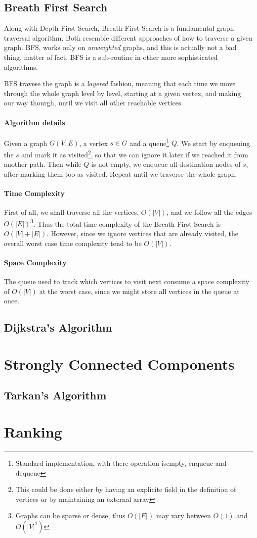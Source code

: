 \documentclass[12pt]{article}
\begin{document}
\subsection{Breath First Search}

Along with Depth First Search, Breath First Search is a fundamental graph traversal algorithm. Both resemble different approaches of how to traverse a given graph. BFS, works only on \textit{unweighted} graphs, and this is actually not a bad thing, matter of fact, BFS is a sub-routine in other more sophisticated algorithms.

BFS travese the graph is a \textit{layered} fashion, meaning that each time we move through the whole graph level by level, starting at a given vertex, and making our way thourgh, until we visit all other reachable vertices.

\paragraph{Algorithm details} Given a graph $G(V,E)$, a vertex $s \in G$ and a queue\footnote{Standard implementation, with there operation isempty, enqueue and dequeue} $Q$. We start by enqueuing the $s$ and mark it as visited\footnote{This could be done either by having an explicite field in the definition of vertices or by maintaining an external array}, so that we can ignore it later if we reached it from another path. Then while $Q$ is not empty, we enqueue all destination nodes of $s$, after marking them too as visited. Repeat until we traverse the whole graph.

\paragraph{Time Complexity} First of all, we shall traverse all the vertices, $O(|V|)$, and we follow all the edges $O(|E|)$\footnote{Graphs can be sparse or dense, thus $O(|E|)$ may vary between $O(1)$ and $O(|V|^2)$}. Thus the total time complexity of the Breath First Search is $O(|V|+|E|)$. However, since we ignore vertices that are already visited, the overall worst case time complexity tend to be $O(|V|)$.

\paragraph{Space Complexity} The queue used to track which vertices to visit next consume a space complexity of $O(|V|)$ at the worst case, since we might store all vertices in the queue at once.

\subsection{Dijkstra's Algorithm}

\section{Strongly Connected Components}
\subsection{Tarkan's Algorithm}

\section{Ranking}
\end{document}
